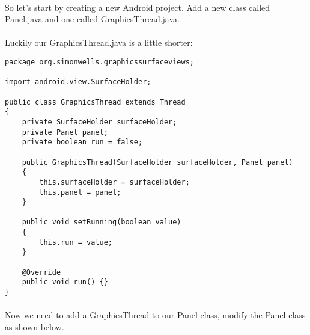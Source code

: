 \paragraph{} So let's start by creating a new Android project. Add a new class called Panel.java and one called GraphicsThread.java. 

\paragraph{} Luckily our GraphicsThread.java is a little shorter:

\begin{lstlisting}
package org.simonwells.graphicssurfaceviews;

import android.view.SurfaceHolder;

public class GraphicsThread extends Thread
{
    private SurfaceHolder surfaceHolder;
    private Panel panel;
    private boolean run = false;

    public GraphicsThread(SurfaceHolder surfaceHolder, Panel panel)
    {
        this.surfaceHolder = surfaceHolder;
        this.panel = panel;
    }

    public void setRunning(boolean value)
    {
        this.run = value;
    }

    @Override
    public void run() {}
}
\end{lstlisting}

\paragraph{} Now we need to add a GraphicsThread to our Panel class, modify the Panel class as shown below.

